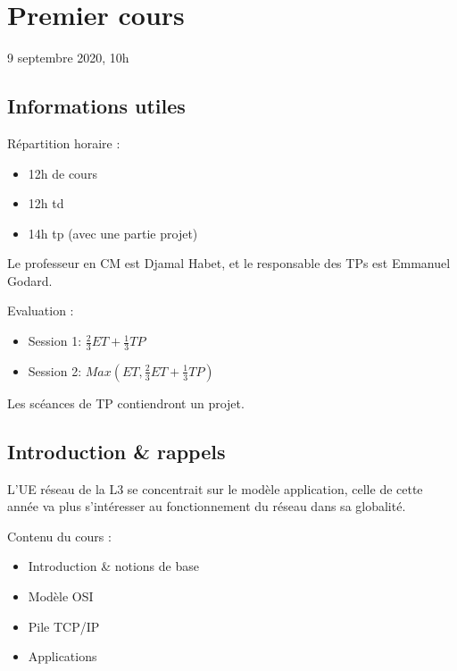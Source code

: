 \hypertarget{premier-cours}{%
\section{Premier cours}\label{premier-cours}}

9 septembre 2020, 10h

\hypertarget{informations-utiles}{%
\subsection{Informations utiles}\label{informations-utiles}}

Répartition horaire :

\begin{itemize}
\tightlist
\item
  12h de cours
\item
  12h td
\item
  14h tp (avec une partie projet)
\end{itemize}

Le professeur en CM est Djamal Habet, et le responsable des TPs est
Emmanuel Godard.

Evaluation :

\begin{itemize}
\tightlist
\item
  Session 1: \(\frac{2}{3}ET+\frac{1}{3}TP\)
\item
  Session 2: \(Max(ET, \frac{2}{3}ET+\frac{1}{3}TP)\)
\end{itemize}

Les scéances de TP contiendront un projet.

\hypertarget{introduction-rappels}{%
\subsection{Introduction \& rappels}\label{introduction-rappels}}

L'UE réseau de la L3 se concentrait sur le modèle application, celle de
cette année va plus s'intéresser au fonctionnement du réseau dans sa
globalité.

Contenu du cours :

\begin{itemize}
\tightlist
\item
  Introduction \& notions de base
\item
  Modèle OSI
\item
  Pile TCP/IP
\item
  Applications
\end{itemize}

